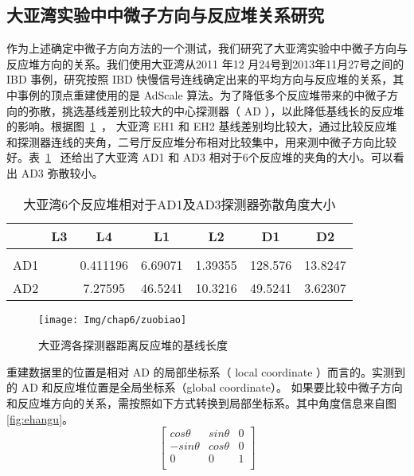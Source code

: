 \subsection{大亚湾实验中中微子方向与反应堆关系研究}
作为上述确定中微子方向方法的一个测试，我们研究了大亚湾实验中中微子方向与反应堆方向的关系。我们使用大亚湾从2011 年12 月24号到2013年11月27号之间的 IBD 事例，研究按照 IBD 快慢信号连线确定出来的平均方向与反应堆的关系，其中事例的顶点重建使用的是 AdScale 算法。为了降低多个反应堆带来的中微子方向的弥散，挑选基线差别比较大的中心探测器（ AD ），以此降低基线长的反应堆的影响。根据图~\ref{fig:baseline}~， 大亚湾 EH1 和 EH2 基线差别均比较大，通过比较反应堆和探测器连线的夹角，二号厅反应堆分布相对比较集中，用来测中微子方向比较好。表~\ref{tab:tcompangu}~ 还给出了大亚湾 AD1 和 AD3 相对于6个反应堆的夹角的大小。可以看出 AD3 弥散较小。%
\begin{table}[htbp]
\centering  %
\begin{tabular}{lcccccc}  %
\hline
&L3 &L4 & L1&L2  &D1 &D2   \\ \hline  %
\\AD1&  &  0.411196 & 6.69071 &  1.39355  & 128.576 & 13.8247    %
\\ AD2  &  & 7.27595   & 46.5241 & 10.3216   &49.5241  & 3.62307 %
\\ \hline
\end{tabular}
\caption{大亚湾6个反应堆相对于AD1及AD3探测器弥散角度大小}
\label{tab:tcompangu}
\end{table}
\begin{figure}[!htbp]
  \centering
   \texttt{[image: Img/chap6/zuobiao]}
    \caption{大亚湾各探测器距离反应堆的基线长度}
  \label{fig:baseline}
\end{figure}
重建数据里的位置是相对 AD 的局部坐标系（ local coordinate ）而言的。实测到的 AD 和反应堆位置是全局坐标系（global coordinate）。 如果要比较中微子方向和反应堆方向的关系，需按照如下方式转换到局部坐标系。其中角度信息来自图\ref{fig:ehangu}。
\begin{equation}
\left[
  \begin{array}{ccc}   %
    cos\theta & sin\theta & 0\\  %
    -sin\theta & cos\theta & 0\\  %
    0&0&1\\
  \end{array}
\right]                %
\end{equation}

